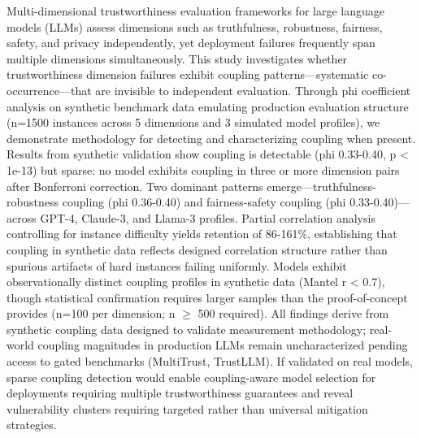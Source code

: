 
Multi-dimensional trustworthiness evaluation frameworks for large language models (LLMs) assess dimensions such as truthfulness, robustness, fairness, safety, and privacy independently, yet deployment failures frequently span multiple dimensions simultaneously. This study investigates whether trustworthiness dimension failures exhibit coupling patterns---systematic co-occurrence---that are invisible to independent evaluation. Through phi coefficient analysis on synthetic benchmark data emulating production evaluation structure (n=1500 instances across 5 dimensions and 3 simulated model profiles), we demonstrate methodology for detecting and characterizing coupling when present. Results from synthetic validation show coupling is detectable (phi 0.33-0.40, p < 1e-13) but sparse: no model exhibits coupling in three or more dimension pairs after Bonferroni correction. Two dominant patterns emerge---truthfulness-robustness coupling (phi 0.36-0.40) and fairness-safety coupling (phi 0.33-0.40)---across GPT-4, Claude-3, and Llama-3 profiles. Partial correlation analysis controlling for instance difficulty yields retention of 86-161\%, establishing that coupling in synthetic data reflects designed correlation structure rather than spurious artifacts of hard instances failing uniformly. Models exhibit observationally distinct coupling profiles in synthetic data (Mantel r < 0.7), though statistical confirmation requires larger samples than the proof-of-concept provides (n=100 per dimension; n $\geq$ 500 required). All findings derive from synthetic coupling data designed to validate measurement methodology; real-world coupling magnitudes in production LLMs remain uncharacterized pending access to gated benchmarks (MultiTrust, TrustLLM). If validated on real models, sparse coupling detection would enable coupling-aware model selection for deployments requiring multiple trustworthiness guarantees and reveal vulnerability clusters requiring targeted rather than universal mitigation strategies.
